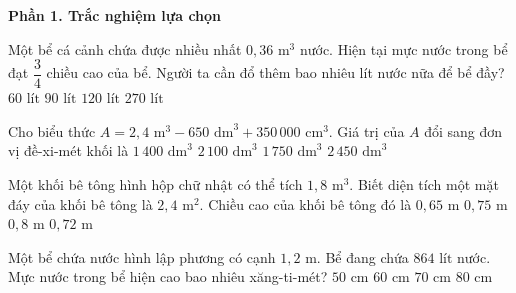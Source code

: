 \textbf{Phần 1. Trắc nghiệm lựa chọn}

\begin{ex} %
Một bể cá cảnh chứa được nhiều nhất $0{,}36\text{ m}^3$ nước. Hiện tại mực nước trong bể đạt $\dfrac{3}{4}$ chiều cao của bể. Người ta cần đổ thêm bao nhiêu lít nước nữa để bể đầy?
\choice
{$60\text{ lít}$}
{\True $90\text{ lít}$}
{$120\text{ lít}$}
{$270\text{ lít}$}
\end{ex}

\begin{ex} %
Cho biểu thức $A = 2{,}4\text{ m}^3 - 650\text{ dm}^3 + 350\,000\text{ cm}^3$. Giá trị của $A$ đổi sang đơn vị đề-xi-mét khối là
\choice
{$1\,400\text{ dm}^3$}
{\True $2\,100\text{ dm}^3$}
{$1\,750\text{ dm}^3$}
{$2\,450\text{ dm}^3$}
\end{ex}

\begin{ex} %
Một khối bê tông hình hộp chữ nhật có thể tích $1{,}8\text{ m}^3$. Biết diện tích một mặt đáy của khối bê tông là $2{,}4\text{ m}^2$. Chiều cao của khối bê tông đó là
\choice
{$0{,}65\text{ m}$}
{\True $0{,}75\text{ m}$}
{$0{,}8\text{ m}$}
{$0{,}72\text{ m}$}
\end{ex}

\begin{ex} %
Một bể chứa nước hình lập phương có cạnh $1{,}2\text{ m}$. Bể đang chứa $864\text{ lít}$ nước. Mực nước trong bể hiện cao bao nhiêu xăng-ti-mét?
\choice
{$50\text{ cm}$}
{\True $60\text{ cm}$}
{$70\text{ cm}$}
{$80\text{ cm}$}
\end{ex}

